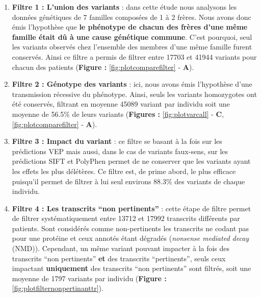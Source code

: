 \documentclass[12pt,a4paper,twoside]{ugathesis}
\theoremstyle{definition}
\theoremstyle{definition}
\theoremstyle{definition}
\theoremstyle{remark}
\begin{document}
\begin{enumerate}
\def\labelenumi{\arabic{enumi}.}
\item
  \textbf{Filtre 1 : L'union des variants} : dans cette étude nous
  analysons les données génétiques de 7 familles composées de 1 à 2
  frères. Nous avons donc émis l'hypothèse que \textbf{le phénotype de
  chacun des frères d'une même famille était dû à une cause génétique
  commune}. C'est pourquoi, seul les variants observés chez l'ensemble
  des membres d'une même famille furent conservés. Ainsi ce filtre a
  permis de filtrer entre 17703 et 41944 variants pour chacun des
  patients (\textbf{Figure : }\ref{fig:plotcomparefilter} - \textbf{A}).
\item
  \textbf{Filtre 2 : Génotype des variants} : ici, nous avons émis
  l'hypothèse d'une transmission récessive du phénotype. Ainsi, seuls
  les variants homozygotes ont été conservés, filtrant en moyenne 45089
  variant par individu soit une moyenne de 56.5\% de leurs variants
  (\textbf{Figures : }\ref{fig:plotvarcall} - \textbf{C},
  \ref{fig:plotcomparefilter} - \textbf{A}).
\item
  \textbf{Filtre 3 : Impact du variant} : ce filtre se basant à la fois
  sur les prédictions VEP mais aussi, dans le cas de variants faux-sens,
  sur les prédictions SIFT et PolyPhen permet de ne conserver que les
  variants ayant les effets les plus délétères. Ce filtre est, de prime
  abord, le plus efficace puisqu'il permet de filtrer à lui seul
  environs 88.3\% des variants de chaque individu.
\item
  \textbf{Filtre 4 : Les transcrits ``non pertinents''} : cette étape de
  filtre permet de filtrer systématiquement entre 13712 et 17992
  transcrits différents par patients. Sont considérés comme
  non-pertinents les transcrits ne codant pas pour une protéine et ceux
  annotés étant dégradés (\emph{nonsense mediated decay} (NMD)).
  Cependant, un même variant pouvant impacter à la fois des transcrits
  ``non pertinents'' \textbf{et} des transcrits ``pertinents'', seuls
  ceux impactant \textbf{uniquement} des transcrits ``non pertinents''
  sont filtrés, soit une moyenne de 1797 variants par individu
  (\textbf{Figure : }\ref{fig:plotfilternonpertinanttr}).
\end{enumerate}

\newpage 
\end{document}
